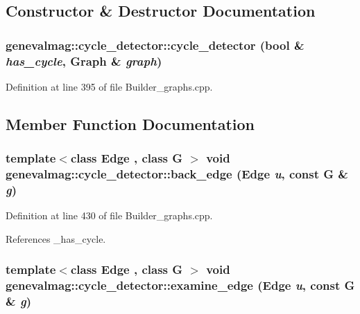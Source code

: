 \subsection{Constructor \& Destructor Documentation}
\hypertarget{structgenevalmag_1_1cycle__detector_d33c61b557029f98461f984f43a25e2d}{
\subsubsection[{cycle\_\-detector}]{\setlength{\rightskip}{0pt plus 5cm}genevalmag::cycle\_\-detector::cycle\_\-detector (bool \& {\em has\_\-cycle}, \/  {\bf Graph} \& {\em graph})}}
\label{structgenevalmag_1_1cycle__detector_d33c61b557029f98461f984f43a25e2d}




Definition at line 395 of file Builder\_\-graphs.cpp.

\subsection{Member Function Documentation}
\hypertarget{structgenevalmag_1_1cycle__detector_9c656f2de80c65c02f061bc75268ea32}{
\subsubsection[{back\_\-edge}]{\setlength{\rightskip}{0pt plus 5cm}template$<$class Edge , class G $>$ void genevalmag::cycle\_\-detector::back\_\-edge (Edge {\em u}, \/  const G \& {\em g})}}
\label{structgenevalmag_1_1cycle__detector_9c656f2de80c65c02f061bc75268ea32}




Definition at line 430 of file Builder\_\-graphs.cpp.

References \_\-has\_\-cycle.\hypertarget{structgenevalmag_1_1cycle__detector_44fccd4a457ae19a0b9fb61cad4f40a7}{
\subsubsection[{examine\_\-edge}]{\setlength{\rightskip}{0pt plus 5cm}template$<$class Edge , class G $>$ void genevalmag::cycle\_\-detector::examine\_\-edge (Edge {\em u}, \/  const G \& {\em g})}}
\label{structgenevalmag_1_1cycle__detector_44fccd4a457ae19a0b9fb61cad4f40a7}


